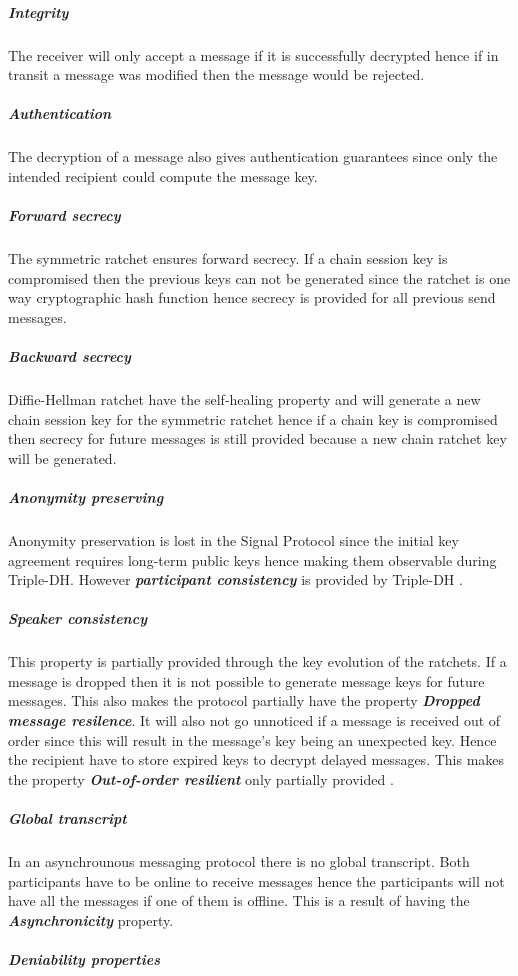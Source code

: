 \subparagraph{Integrity} The receiver will only accept a message if it is successfully decrypted hence if in transit a message was modified then the message would be rejected.

\subparagraph{Authentication} The decryption of a message also gives authentication guarantees since only the intended recipient could compute the message key.

\subparagraph{Forward secrecy} The symmetric ratchet ensures forward secrecy. If a chain session key is compromised then the previous keys can not be generated since the ratchet is one way cryptographic hash function hence secrecy is provided for all previous send messages.  

\subparagraph{Backward secrecy} Diffie-Hellman ratchet have the self-healing property and will generate a new chain session key for the symmetric ratchet hence if a chain key is compromised then secrecy for future messages is still provided because a new chain ratchet key will be generated.

\subparagraph{Anonymity preserving}

Anonymity preservation is lost in the Signal Protocol since the initial key agreement requires long-term public keys hence making them observable during Triple-DH. However \textbf{\emph{participant consistency}} is provided by Triple-DH \cite{sok}. %

\subparagraph{Speaker consistency}
This property is partially provided through the key evolution of the ratchets. If a message is dropped then it is not possible to generate message keys for future messages. This also makes the protocol partially have the property \emph{\textbf{Dropped message resilence}}. It will also not go unnoticed if a message is received out of order since this will result in the message's key being an unexpected key. Hence the recipient have to store expired keys to decrypt delayed messages. This makes the property \emph{\textbf{Out-of-order resilient}} only partially provided \cite{sok}.

\subparagraph{Global transcript} 
In an asynchrounous messaging protocol there is no global transcript. Both participants have to be online to receive messages hence the participants will not have all the messages if one of them is offline. This is a result of having the \textbf{\emph{Asynchronicity}} property.

\subparagraph{Deniability properties}

